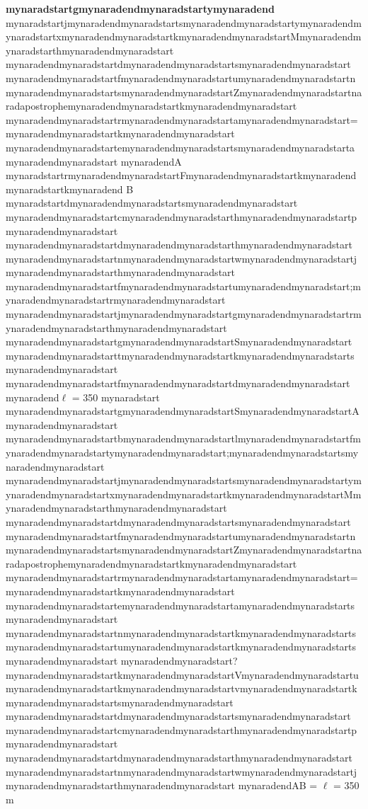 \documentclass{scrbook}
\begin{document}
\textbf{mynaradstartgmynaradendmynaradstartymynaradend} mynaradstartjmynaradendmynaradstartsmynaradendmynaradstartymynaradendmynaradstartxmynaradendmynaradstartkmynaradendmynaradstartMmynaradendmynaradstarthmynaradendmynaradstart mynaradendmynaradstartdmynaradendmynaradstartsmynaradendmynaradstart mynaradendmynaradstartfmynaradendmynaradstartumynaradendmynaradstartnmynaradendmynaradstartsmynaradendmynaradstartZmynaradendmynaradstartnaradapostrophemynaradendmynaradstartkmynaradendmynaradstart mynaradendmynaradstartrmynaradendmynaradstartamynaradendmynaradstart=mynaradendmynaradstartkmynaradendmynaradstart mynaradendmynaradstartemynaradendmynaradstartsmynaradendmynaradstartamynaradendmynaradstart mynaradendA mynaradstartrmynaradendmynaradstartFmynaradendmynaradstartkmynaradendmynaradstartkmynaradend B mynaradstartdmynaradendmynaradstartsmynaradendmynaradstart mynaradendmynaradstartcmynaradendmynaradstarthmynaradendmynaradstartpmynaradendmynaradstart mynaradendmynaradstartdmynaradendmynaradstarthmynaradendmynaradstart mynaradendmynaradstartnmynaradendmynaradstartwmynaradendmynaradstartjmynaradendmynaradstarthmynaradendmynaradstart mynaradendmynaradstartfmynaradendmynaradstartumynaradendmynaradstart;mynaradendmynaradstartrmynaradendmynaradstart mynaradendmynaradstartjmynaradendmynaradstartgmynaradendmynaradstartrmynaradendmynaradstarthmynaradendmynaradstart mynaradendmynaradstartgmynaradendmynaradstartSmynaradendmynaradstart mynaradendmynaradstarttmynaradendmynaradstartkmynaradendmynaradstartsmynaradendmynaradstart mynaradendmynaradstartfmynaradendmynaradstartdmynaradendmynaradstart mynaradend${\ell}$ = 350 mynaradstart mynaradendmynaradstartgmynaradendmynaradstartSmynaradendmynaradstartAmynaradendmynaradstart mynaradendmynaradstartbmynaradendmynaradstartlmynaradendmynaradstartfmynaradendmynaradstartymynaradendmynaradstart;mynaradendmynaradstartsmynaradendmynaradstart mynaradendmynaradstartjmynaradendmynaradstartsmynaradendmynaradstartymynaradendmynaradstartxmynaradendmynaradstartkmynaradendmynaradstartMmynaradendmynaradstarthmynaradendmynaradstart mynaradendmynaradstartdmynaradendmynaradstartsmynaradendmynaradstart mynaradendmynaradstartfmynaradendmynaradstartumynaradendmynaradstartnmynaradendmynaradstartsmynaradendmynaradstartZmynaradendmynaradstartnaradapostrophemynaradendmynaradstartkmynaradendmynaradstart mynaradendmynaradstartrmynaradendmynaradstartamynaradendmynaradstart=mynaradendmynaradstartkmynaradendmynaradstart mynaradendmynaradstartemynaradendmynaradstartamynaradendmynaradstartsmynaradendmynaradstart mynaradendmynaradstartnmynaradendmynaradstartkmynaradendmynaradstartsmynaradendmynaradstartumynaradendmynaradstartkmynaradendmynaradstartsmynaradendmynaradstart mynaradendmynaradstart?mynaradendmynaradstartkmynaradendmynaradstartVmynaradendmynaradstartumynaradendmynaradstartkmynaradendmynaradstartvmynaradendmynaradstartkmynaradendmynaradstartsmynaradendmynaradstart mynaradendmynaradstartdmynaradendmynaradstartsmynaradendmynaradstart mynaradendmynaradstartcmynaradendmynaradstarthmynaradendmynaradstartpmynaradendmynaradstart mynaradendmynaradstartdmynaradendmynaradstarthmynaradendmynaradstart mynaradendmynaradstartnmynaradendmynaradstartwmynaradendmynaradstartjmynaradendmynaradstarthmynaradendmynaradstart mynaradendAB = ${\ell}$ = 350 m 
\end{document}
